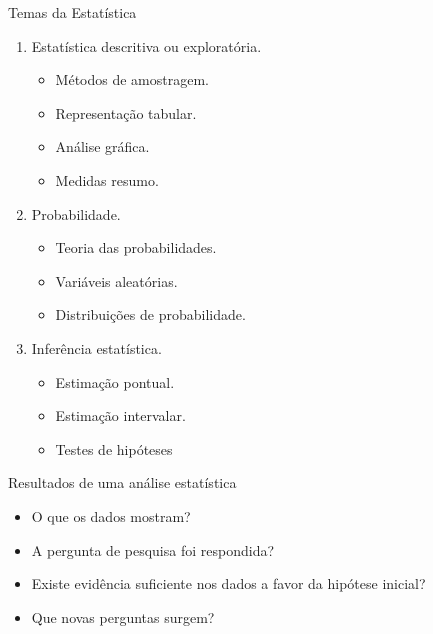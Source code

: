\documentclass[
  ignorenonframetext,
  serif,
  professionalfont,
  usenames,
  dvipsnames,
  aspectratio = 169]{beamer}
\providecommand{\tightlist}{%
  \setlength{\itemsep}{0pt}\setlength{\parskip}{0pt}}
\renewcommand{\tightlist}{%
  \setlength{\itemsep}{0\baselineskip}
  \setlength{\parskip}{0.25\baselineskip}
}
\def\beginAHalfColumn{\begin{minipage}{0.49\textwidth}}%
\def\endColumns{\end{minipage}}%
\begin{document}
\begin{frame}{Temas da Estatística}
\protect\hypertarget{temas-da-estatuxedstica-1}{}
\beginAHalfColumn

\begin{enumerate}
\tightlist
\item
  Estatística descritiva ou exploratória.

  \begin{itemize}
  \tightlist
  \item
    Métodos de amostragem.
  \item
    Representação tabular.
  \item
    Análise gráfica.
  \item
    Medidas resumo.
  \end{itemize}
\item
  Probabilidade.

  \begin{itemize}
  \tightlist
  \item
    Teoria das probabilidades.
  \item
    Variáveis aleatórias.
  \item
    Distribuições de probabilidade.
  \end{itemize}
\end{enumerate}

\endColumns
\beginAHalfColumn

\begin{enumerate}
\setcounter{enumi}{2}
\tightlist
\item
  Inferência estatística.

  \begin{itemize}
  \tightlist
  \item
    Estimação pontual.
  \item
    Estimação intervalar.
  \item
    Testes de hipóteses
  \end{itemize}
\end{enumerate}

\endColumns
\end{frame}

\begin{frame}{Resultados de uma análise estatística}
\protect\hypertarget{resultados-de-uma-anuxe1lise-estatuxedstica}{}
\begin{itemize}
\tightlist
\item
  O que os dados mostram?
\item
  A pergunta de pesquisa foi respondida?
\item
  Existe evidência suficiente nos dados a favor da hipótese inicial?
\item
  Que novas perguntas surgem?
\end{itemize}
\end{frame}
\end{document}

